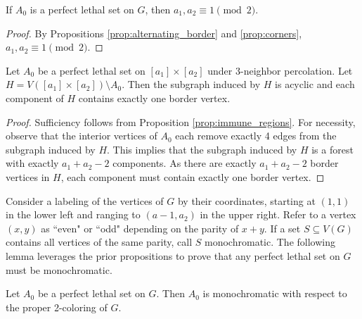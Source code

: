 \begin{prop}
If $A_0$ is a perfect lethal set on $G$, then $a_1, a_2 \equiv 1 \pmod 2$.
\end{prop}

\begin{proof}
By Propositions \ref{prop:alternating_border} and \ref{prop:corners}, $a_1, a_2 \equiv 1 \pmod 2$.
\end{proof}

\begin{prop}
\label{prop:one_border_vertex}
Let $A_0$ be a perfect lethal set on $[a_1] \times [a_2]$ under 3-neighbor percolation. Let $H = V([a_1] \times [a_2]) \setminus A_0$. Then the subgraph induced by $H$ is acyclic and each component of $H$ contains exactly one border vertex.
\end{prop}

\begin{proof}
Sufficiency follows from Proposition \ref{prop:immune_regions}. For necessity, observe that the interior vertices of $A_0$ each remove exactly 4 edges from the subgraph induced by $H$. This implies that the subgraph induced by $H$ is a forest with exactly $a_1 + a_2 - 2$ components. As there are exactly $a_1 + a_2 - 2$ border vertices in $H$, each component must contain exactly one border vertex.
\end{proof}

Consider a labeling of the vertices of $G$ by their coordinates, starting at $(1,1)$ in the lower left and ranging to $(a-1,a_2)$ in the upper right. Refer to a vertex $(x,y)$ as ``even" or ``odd" depending on the parity of $x+y$. If a set $S \subseteq V(G)$ contains all vertices of the same parity, call $S$ monochromatic. The following lemma leverages the prior propositions to prove that any perfect lethal set on $G$ must be monochromatic.

\begin{lem}
Let $A_0$ be a perfect lethal set on $G$. Then $A_0$ is monochromatic with respect to the proper 2-coloring of $G$.
\end{lem}

